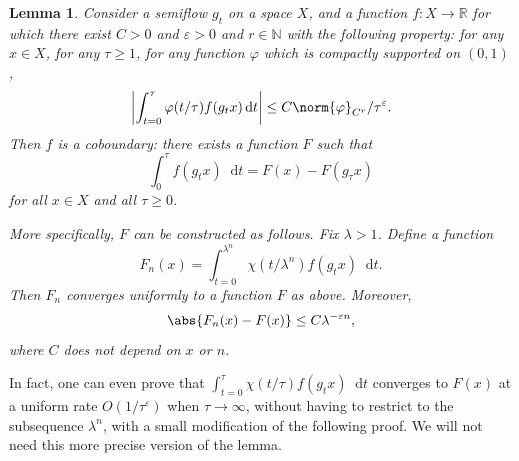 \documentclass[10pt]{amsart}
\newcommand{\N}{\mathbb{N}}
\newcommand{\R}{\mathbb{R}}
\newcommand{\dd}{\mathop{}\!\mathrm{d}}
\newcommand{\absgg}[1]{\biggl \lvert#1\biggr\rvert}
\let\epsilon\varepsilon
\let\phi\varphi
\newtheorem{lem}[thm]{Lemma}
\theoremstyle{definition}
\numberwithin{equation}{section}
\begin{document}
\begin{lem}
\label{lem:GL_coboundary} Consider a semiflow $g_t$ on a space $X$, and a
function $f:X \to \R$ for which there exist $C>0$ and $\epsilon>0$ and $r\in
\N$ with the following property: for any $x \in X$, for any $\tau\geq 1$, for
any function $\phi$ which is compactly supported on $(0,1)$,
\begin{equation}
\label{eq:ziuerpoiuprt}
\absgg{\int_{t=0}^\tau \phi(t/\tau) f(g_t x) \dd t} \leq C\norm{\phi}_{C^r}/\tau^\epsilon.
\end{equation}
Then $f$ is a coboundary: there exists a function $F$ such that\[
\int_0^\tau
f(g_t x) \dd t = F(x) - F(g_\tau x)
\]
for all $x\in X$ and all $\tau \geq 0$.

More specifically, $F$ can be constructed as follows. Fix $\lambda > 1$.
Define a function
\[
F_n(x) = \int_{t=0}^{\lambda^n} \chi(t/\lambda^n) f(g_t x)
\dd t.
\]
Then $F_n$ converges uniformly to a function $F$ as above. Moreover,
\[
\abs{F_n(x)-F(x)} \leq C \lambda^{-\epsilon n},
\]
where $C$ does not depend on
$x$ or $n$.
\end{lem}
In fact, one can even prove that $\int_{t=0}^{\tau} \chi(t/\tau) f(g_t x) \dd
t$ converges to $F(x)$ at a uniform rate $O(1/\tau^\epsilon)$ when $\tau\to
\infty$, without having to restrict to the subsequence $\lambda^n$, with a
small modification of the following proof. We will not need this more precise
version of the lemma.
\end{document}
